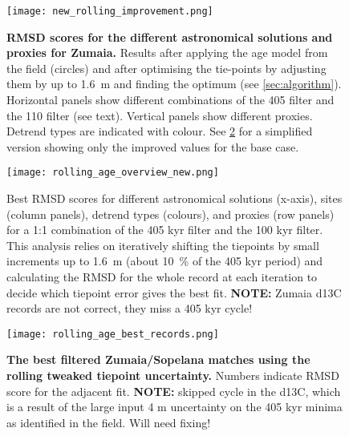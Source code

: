 \documentclass[draft]{agujournal2019}
\begin{document}
\begin{figure}[htb]
  \centering \texttt{[image: new\_rolling\_improvement.png]}
  \caption{\label{fig:rolling-rmsd-improvement} \textbf{RMSD scores for the
      different astronomical solutions and proxies for Zumaia.} Results after
    applying the age model from the field \cite{Batenburg2012,Batenburg2014}
    (circles) and after optimising the tie-points by adjusting them by up to
    \qty{1.6}{\metre} and finding the optimum (see \cref{sec:algorithm}).
    Horizontal panels show different combinations of the \qty{405}{\kiloyear}
    filter and the \qty{110}{\kiloyear} filter (see text). Vertical panels show
    different proxies. Detrend types are indicated with colour. See
    \cref{fig:rolling-rmsd} for a simplified version showing only the improved
    values for the base case.}
\end{figure}

\begin{figure}[htb]
  \centering
  \texttt{[image: rolling\_age\_overview\_new.png]}
  \caption{\label{fig:rolling-rmsd} Best \gls{RMSD} scores for different
    astronomical solutions (x-axis), sites (column panels), detrend types
    (colours), and proxies (row panels) for a 1:1 combination of the 405 kyr
    filter and the 100 kyr filter. This analysis relies on iteratively shifting the tiepoints by
    small increments up to \textpm\qty{1.6}{\metre} (about \qty{10}{\percent} of the
    405 kyr period) and calculating the \gls{RMSD} for the whole
    record at each iteration to decide which tiepoint error gives the best fit.
    \textbf{NOTE:} Zumaia \gls{d13C} records are not correct, they miss a 405
    kyr cycle! }
\end{figure}


\begin{figure}[htb]
  \centering
  \texttt{[image: rolling\_age\_best\_records.png]}
  \caption{\label{fig:rolling-age} \textbf{The best filtered Zumaia/Sopelana
      matches using the rolling tweaked tiepoint uncertainty.} Numbers indicate
    \gls{RMSD} score for the adjacent fit. \textbf{NOTE:} skipped cycle in the
    \gls{d13C}, which is a result of the large input \textpm{}4 m uncertainty on the
    405 kyr minima as identified in the field. Will need fixing! }
\end{figure}
\end{document}
